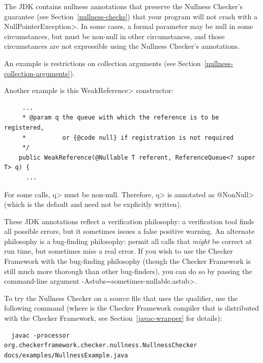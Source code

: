 The JDK contains nullness annotations that preserve the Nullness Checker's
guarantee (see Section~\ref{nullness-checks}) that your program will not
crash with a \<NullPointerException>.  In some cases, a formal parameter
may be null in some circumstances, but must be non-null in other
circumstances, and those circumstances are not expressible using the
Nullness Checker's annotations.

An example is restrictions on collection arguments (see
Section~\ref{nullness-collection-arguments}).

Another example is this \<WeakReference> constructor:

\begin{Verbatim}
     ...
     * @param q the queue with which the reference is to be registered,
     *          or {@code null} if registration is not required
     */
    public WeakReference(@Nullable T referent, ReferenceQueue<? super T> q) {
      ...
\end{Verbatim}

For some calls, \<q> must be non-null.  Therefore, \<q> is annotated as
\<@NonNull> (which is the default and need not be explicitly written).

These JDK annotations reflect a verification philosophy:  a verification
tool finds all possible errors, but it sometimes issues a false positive warning.
An alternate philosophy is a bug-finding philosophy:  permit all calls that
\emph{might} be correct at run time, but sometimes miss a real error.  If
you wish to use the Checker Framework with the bug-finding philosophy
(though the Checker Framework is still much more thorough than other
bug-finders), you can do so by passing the command-line argument
\<-Astubs=sometimes-nullable.astub>.




To try the Nullness Checker on a source file that uses the  qualifier,
use the following command (where  is the Checker Framework compiler that
is distributed with the Checker Framework, see Section~\ref{javac-wrapper}
for details):

\begin{smaller}
\begin{Verbatim}
  javac -processor org.checkerframework.checker.nullness.NullnessChecker docs/examples/NullnessExample.java
\end{Verbatim}
\end{smaller}

